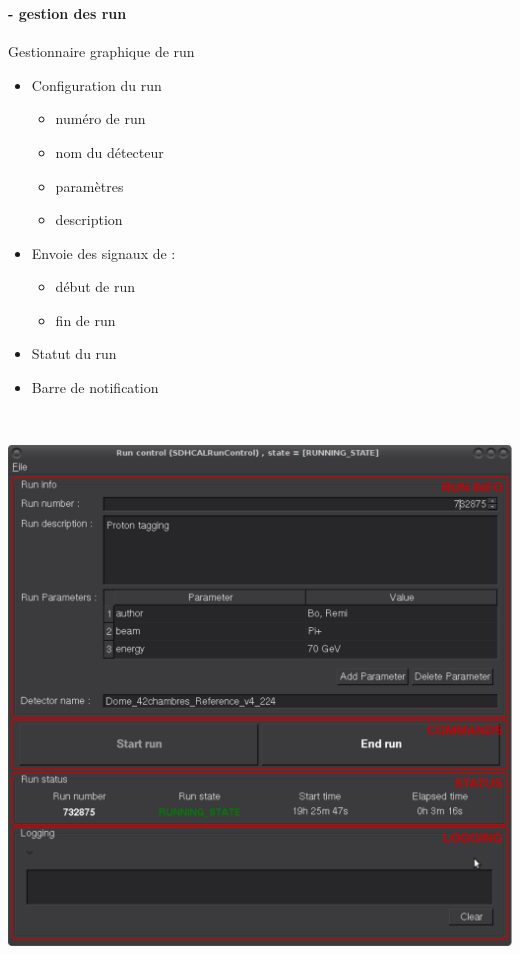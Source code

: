 \documentclass[8pt]{beamer}
\begin{document}
  \begin{frame}
  \frametitle{\secname}
  \framesubtitle{\subsecname - gestion des run}
    \begin{minipage}{0.33\linewidth}
      \begin{block}{Gestionnaire graphique de run}
        \begin{itemize}
          \item Configuration du run
          \begin{itemize}
            \item numéro de run
            \item nom du détecteur
            \item paramètres
            \item description
          \end{itemize}
          \item Envoie des signaux de :
          \begin{itemize}
            \item début de run
            \item fin de run
          \end{itemize}
          \item Statut du run
          \item Barre de notification
        \end{itemize}
      \end{block}
    \end{minipage} ~\hfill
    \begin{minipage}{0.6\linewidth}
      \begin{center}
        \includegraphics[width=\linewidth]{RunControlGUI.pdf}
      \end{center}
    \end{minipage}
  \end{frame}
\end{document}
